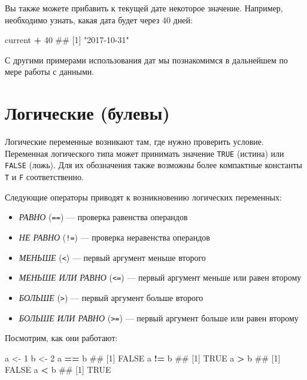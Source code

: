\documentclass[]{book}
\newenvironment{Shaded}{\begin{snugshade}}{\end{snugshade}}
\newcommand{\DecValTok}[1]{\textcolor[rgb]{0.00,0.00,0.81}{#1}}
\newcommand{\StringTok}[1]{\textcolor[rgb]{0.31,0.60,0.02}{#1}}
\newcommand{\OperatorTok}[1]{\textcolor[rgb]{0.81,0.36,0.00}{\textbf{#1}}}
\newcommand{\NormalTok}[1]{#1}
\providecommand{\tightlist}{%
  \setlength{\itemsep}{0pt}\setlength{\parskip}{0pt}}
\begin{document}
Вы также можете прибавить к текущей дате некоторое значение. Например,
необходимо узнать, какая дата будет через 40 дней:

\begin{Shaded}
\begin{Highlighting}[]
\NormalTok{current }\OperatorTok{+}\StringTok{ }\DecValTok{40}
\NormalTok{## [1] "2017-10-31"}
\end{Highlighting}
\end{Shaded}

С другими примерами использования дат мы познакомимся в дальнейшем по
мере работы с данными.

\section{Логические (булевы)}\label{-}

Логические переменные возникают там, где нужно проверить условие.
Переменная логического типа может принимать значение \texttt{TRUE}
(истина) или \texttt{FALSE} (ложь). Для их обозначения также возможны
более компактные константы \texttt{T} и \texttt{F} соответственно.

Следующие операторы приводят к возникновению логических переменных:

\begin{itemize}
\tightlist
\item
  \emph{РАВНО} (\texttt{==}) --- проверка равенства операндов
\item
  \emph{НЕ РАВНО} (\texttt{!=}) --- проверка неравенства операндов
\item
  \emph{МЕНЬШЕ} (\texttt{\textless{}}) --- первый аргумент меньше
  второго
\item
  \emph{МЕНЬШЕ ИЛИ РАВНО} (\texttt{\textless{}=}) --- первый аргумент
  меньше или равен второму
\item
  \emph{БОЛЬШЕ} (\texttt{\textgreater{}}) --- первый аргумент больше
  второго
\item
  \emph{БОЛЬШЕ ИЛИ РАВНО} (\texttt{\textgreater{}=}) --- первый аргумент
  больше или равен второму
\end{itemize}

Посмотрим, как они работают:

\begin{Shaded}
\begin{Highlighting}[]
\NormalTok{a <-}\StringTok{ }\DecValTok{1}
\NormalTok{b <-}\StringTok{ }\DecValTok{2}
\NormalTok{a }\OperatorTok{==}\StringTok{ }\NormalTok{b}
\NormalTok{## [1] FALSE}
\NormalTok{a }\OperatorTok{!=}\StringTok{ }\NormalTok{b}
\NormalTok{## [1] TRUE}
\NormalTok{a }\OperatorTok{>}\StringTok{ }\NormalTok{b}
\NormalTok{## [1] FALSE}
\NormalTok{a }\OperatorTok{<}\StringTok{ }\NormalTok{b}
\NormalTok{## [1] TRUE}
\end{Highlighting}
\end{Shaded}
\end{document}
